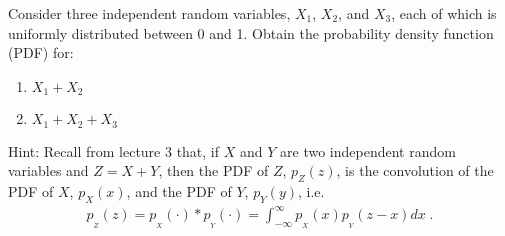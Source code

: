 \item 
Consider three independent random variables, $X_1$, $X_2$, and $X_3$, each of which is uniformly distributed between 0 and 1. Obtain the probability density function (PDF) for:

\begin{enumerate}
\item $X_1 + X_2$

\item $X_1 + X_2 + X_3$
\end{enumerate}

Hint: Recall from lecture 3 that, if $X$ and $Y$ are two independent random variables and $Z = X + Y$, then the PDF of $Z$, $p_Z(z)$, is the convolution of the PDF of $X$, $p_X(x)$, and the PDF of $Y$, $p_Y(y)$, i.e.
\begin{align*}
    p_{_Z}(z) = p_{_X}(\cdot) * p_{_Y}(\cdot) = \int_{-\infty}^\infty p_{_X}(x) p_{_Y}(z-x) dx \; .
\end{align*}


